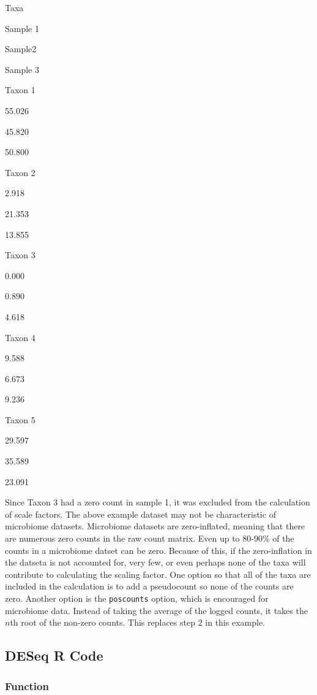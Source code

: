 \documentclass[
]{book}
\begin{document}
Taxa

Sample 1

Sample2

Sample 3

Taxon 1

55.026

45.820

50.800

Taxon 2

2.918

21.353

13.855

Taxon 3

0.000

0.890

4.618

Taxon 4

9.588

6.673

9.236

Taxon 5

29.597

35.589

23.091

Since Taxon 3 had a zero count in sample 1, it was excluded from the calculation of scale factors. The above example dataset may not be characteristic of microbiome datasets. Microbiome datasets are zero-inflated, meaning that there are numerous zero counts in the raw count matrix. Even up to 80-90\% of the counts in a microbiome datset can be zero. Because of this, if the zero-inflation in the datseta is not accounted for, very few, or even perhaps none of the taxa will contribute to calculating the scaling factor. One option so that all of the taxa are included in the calculation is to add a pseudocount so none of the counts are zero. Another option is the \texttt{poscounts} option, which is encouraged for microbiome data. Instead of taking the average of the logged counts, it takes the \(n\)th root of the non-zero counts. This replaces step 2 in this example.

\hypertarget{deseq-r-code}{%
\subsection{DESeq R Code}\label{deseq-r-code}}

\hypertarget{function-2}{%
\subsubsection{Function}\label{function-2}}
\end{document}
